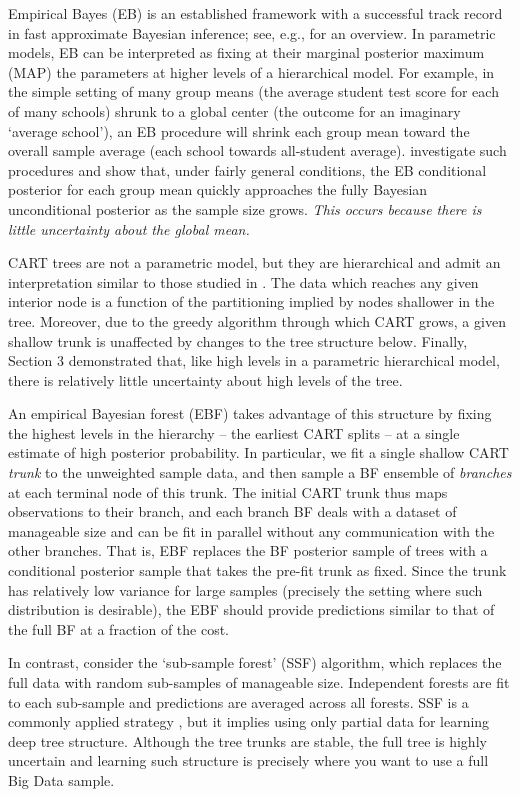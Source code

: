 \documentclass{article}
\begin{document}
Empirical Bayes (EB) is an established framework with a
successful track record in fast approximate Bayesian inference; see,
e.g., \citet{efron_large-scale_2010} for an overview. In parametric
models, EB can be interpreted as fixing at their marginal posterior
maximum (MAP) the parameters at higher levels of a hierarchical
model. For example, in the simple setting of many group means (the
average student test score for each of many schools) shrunk to a global center (the outcome for an imaginary `average school'),
an EB procedure will shrink each group mean toward the overall sample average (each school towards all-student average). \citet{kass_approximate_1989}
investigate such procedures and show that, under fairly general
conditions, the EB conditional posterior for each group mean  quickly
approaches the fully Bayesian unconditional posterior as the sample size
grows.  \textit{This occurs because there is little uncertainty about the global mean.}

CART trees are not a parametric model, but they are hierarchical and
admit an interpretation similar to those studied in
\citet{kass_approximate_1989}. The data which reaches any given interior
node is a function of the partitioning implied by nodes shallower in the
tree. Moreover, due to the greedy algorithm through which CART
grows, a given shallow trunk is unaffected by changes to the tree
structure below. Finally, Section 3 demonstrated that, like high levels in a parametric hierarchical model, there is relatively little uncertainty about high levels of the tree.

An empirical Bayesian forest (EBF) takes advantage of this structure by fixing
the highest levels in the hierarchy -- the earliest CART splits -- at a single
estimate of high posterior probability. In particular,  we fit a single
shallow CART \textit{trunk} to the unweighted sample data, and then sample a
BF ensemble of \textit{branches} at each terminal node of this trunk.  The
initial CART trunk thus maps observations to their branch, and each branch BF
deals with a dataset of manageable size and can be fit in parallel without any
communication with the other branches. That is, EBF replaces the BF posterior
sample of trees with a conditional posterior sample that takes the pre-fit
trunk as fixed. Since the trunk has relatively low variance for large samples
(precisely the setting where such distribution is desirable), the EBF should
provide predictions similar to that of the full BF at a fraction of the cost.

In contrast, consider the `sub-sample forest' (SSF) algorithm, which replaces the full data with random sub-samples of manageable size.  Independent forests are  fit to each sub-sample and predictions are averaged across all forests.
SSF is a commonly applied strategy \citep[e.g., see mention, but not recommendation, of it in][]{panda_planet:_2009}, but it implies using only partial data for learning deep tree structure.  Although the tree trunks are stable, the full tree is highly uncertain and learning such structure is precisely where you want to use a full Big Data sample.
\end{document}
